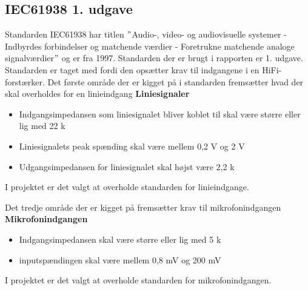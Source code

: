 \subsection*{IEC61938 1. udgave}
\label{IEC61938}
Standarden IEC61938 har titlen $"$Audio-, video- og audiovisuelle systemer - Indbyrdes forbindelser og matchende værdier - Foretrukne matchende analoge signalværdier$"$ og er fra 1997. Standarden der er brugt i rapporten er 1. udgave. Standarden er taget med fordi den opsætter krav til indgangene i en HiFi-forstærker.\cite{IEC61938} 
\newline
\newline
Det første område der er kigget på i standarden fremsætter hvad der skal overholdes for en linieindgang
\newline
\newline
\textbf{Liniesignaler}
\begin{itemize}
\item Indgangsimpedansen som liniesignalet bliver koblet til skal være større eller lig med 22 k\ohm 
\item Liniesignalets peak spænding skal være mellem 0,2 V og 2 V
\item Udgangsimpedansen for liniesignalet skal højst være 2,2 k\ohm
\end{itemize}
I projektet er det valgt at overholde standarden for linieindgange.


Det tredje område der er kigget på fremsætter krav til mikrofonindgangen
\newline 
\newline
\textbf{Mikrofonindgangen}
\begin{itemize}
\item Indgangsimpedansen skal være større eller lig med 5 k\ohm
\item inputspændingen skal være mellem 0,8 mV og 200 mV
\end{itemize}
I projektet er det valgt at overholde standarden for mikrofonindgangen.

